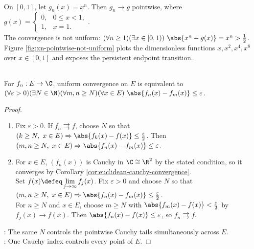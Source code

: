 \begin{example} \label{ex:xn-pointwise-not-uniform} \\
On $[0,1]$, let $g_n(x)=x^n$. Then $g_n\to g$ pointwise, where $g(x)=
\begin{cases}
0, & 0\leq x<1,\\
1, & x=1.
\end{cases}$.\\
The convergence is not uniform: $(\forall n\geq1)(\exists x\in[0,1))\ \abs{x^n-g(x)}=x^n>\frac{1}{2}$.\\
Figure \ref{fig:xn-pointwise-not-uniform} plots the dimensionless functions $x,x^2,x^4,x^8$ over $x\in[0,1]$ and exposes the persistent endpoint transition.
\end{example}

\begin{visualizationfigure}[H]
  \centering
  
  \caption{$x^n\to0$ pointwise on $[0,1)$, but the endpoint prevents uniform convergence on $[0,1]$.}
  \label{fig:xn-pointwise-not-uniform}
\end{visualizationfigure}

\begin{theorem} \label{thm:uniform-cauchy-criterion} \\
For $f_n:E\to\C$, uniform convergence on $E$ is equivalent to $(\forall\varepsilon>0)(\exists N\in\N)(\forall m,n\geq N)(\forall x\in E)\ \abs{f_n(x)-f_m(x)}\leq\varepsilon$.
\begin{proof}
\begin{enumerate}[label=\roman*.]
\setlength{\itemsep}{0pt}
\item[$(\Rightarrow)$] Fix $\varepsilon>0$. If $f_n\rightrightarrows f$, choose $N$ so that $(k\geq N,\ x\in E)\Rightarrow\abs{f_k(x)-f(x)}\leq\frac{\varepsilon}{2}$. Then $(m,n\geq N,\ x\in E)\Rightarrow\abs{f_n(x)-f_m(x)}\leq\varepsilon$.
\item[$(\Leftarrow)$] For $x\in E$, $(f_n(x))$ is Cauchy in $\C\cong\R^2$ by the stated condition, so it converges by Corollary \ref{cor:euclidean-cauchy-convergence}.\\
Set $f(x)\defeq\lim\limits_{j\to\infty}f_j(x)$. Fix $\varepsilon>0$ and choose $N$ so that $(m,n\geq N,\ x\in E)\Rightarrow\abs{f_n(x)-f_m(x)}\leq\frac{\varepsilon}{2}$.\\
For $n\geq N$ and $x\in E$, choose $m\geq N$ with $\abs{f_m(x)-f(x)}<\frac{\varepsilon}{2}$ by $f_j(x)\to f(x)$. Then $\abs{f_n(x)-f(x)}\leq\varepsilon$, so $f_n\rightrightarrows f$.
\end{enumerate}
: The same $N$ controls the pointwise Cauchy tails simultaneously across $E$.\\
: One Cauchy index controls every point of $E$.
\end{proof}
\end{theorem}


